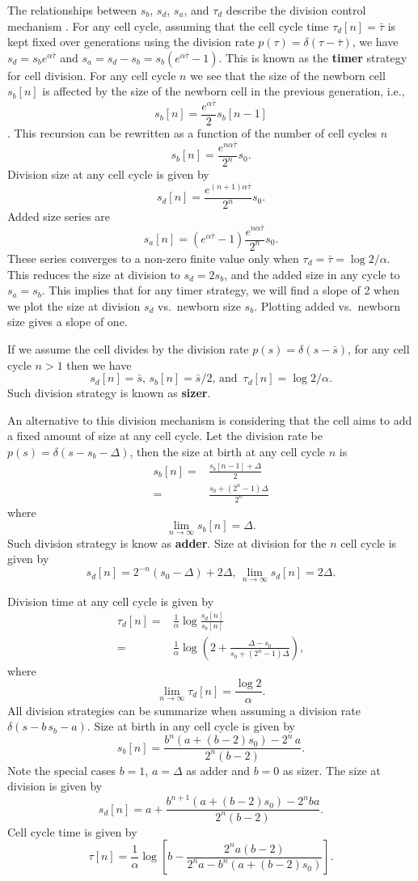 \documentclass[
  letterpaper,
  DIV=11,
  numbers=noendperiod]{scrreprt}
\begin{document}
The relationships between \(s_b\), \(s_d\), \(s_a\), and \(\tau_d\)
describe the division control mechanism \cite{}. For any cell cycle,
assuming that the cell cycle time \(\tau_d[n]=\bar{\tau}\) is kept fixed
over generations using the division rate
\(p(\tau)=\delta(\tau-\bar{\tau})\), we have
\(s_d=s_b e^{\alpha \bar{\tau}}\) and
\(s_a=s_d-s_b=s_b (e^{\alpha \bar{\tau}}-1)\). This is known as the
\textbf{timer} strategy for cell division. For any cell cycle \(n\) we
see that the size of the newborn cell \(s_b[n]\) is affected by the size
of the newborn cell in the previous generation, i.e.,
\[s_b[n]=\frac{e^{\alpha \bar{\tau}}}{2}s_b[n-1]\]. This recursion can
be rewritten as a function of the number of cell cycles \(n\)
\[s_b[n]= \frac{e^{n \alpha \bar{\tau}}}{2^{n}} s_0.\] Division size at
any cell cycle is given by
\[s_d[n]= \frac{e^{(n+1) \alpha \bar{\tau}}}{2^{n}} s_0.\] Added size
series are
\[s_a[n]= (e^{\alpha \bar{\tau}}-1)\frac{e^{n \alpha \bar{\tau}}}{2^{n}} s_0.\]
These series converges to a non-zero finite value only when
\(\tau_d=\bar{\tau}=\log{2}/\alpha.\) This reduces the size at division
to \(s_d=2 s_b\), and the added size in any cycle to \(s_a=s_b\). This
implies that for any timer strategy, we will find a slope of 2 when we
plot the size at division \(s_d\) vs.~newborn size \(s_b\). Plotting
added vs.~newborn size gives a slope of one.

If we assume the cell divides by the division rate
\(p(s)=\delta(s-\bar{s})\), for any cell cycle \(n>1\) then we have
\[s_d[n]=\bar{s},\, s_b[n]=\bar{s}/2,\, \text{and } \, \tau_d[n]=\log{2}/\alpha.\]
Such division strategy is known as \textbf{sizer}.

An alternative to this division mechanism is considering that the cell
aims to add a fixed amount of size at any cell cycle. Let the division
rate be \(p(s)=\delta(s-s_b-\Delta)\), then the size at birth at any
cell cycle \(n\) is \[\begin{aligned}
    s_b[n]=&\frac{s_b[n-1]+\Delta}{2}\\
    =&\frac{s_0+(2^n-1)\Delta}{2^n}
\end{aligned}\] where \[\lim_{n\to \infty}s_b[n]=\Delta.\] Such division
strategy is know as \textbf{adder}. Size at division for the \(n\) cell
cycle is given by \[
s_d[n]=2^{-n}(s_0 -\Delta)+2 \Delta, \, \lim_{n\to \infty}s_d[n]=2 \Delta.
\]

Division time at any cell cycle is given by \[\begin{aligned}
    \tau_d[n]=&\frac{1}{\alpha}\log \frac{s_d[n]}{s_b[n]}\\
    =&\frac{1}{\alpha}\log\left({2+\frac{\Delta-s_0}{s_0+(2^n-1)\Delta}}\right), 
\end{aligned}\] where
\[\lim_{n\to \infty}\tau_d[n]=\frac{\log 2}{\alpha}.\] All division
strategies can be summarize when assuming a division rate
\(\delta(s-b\,s_b-a)\). Size at birth in any cell cycle is given by \[
s_b[n]=\frac{b^n(a+(b-2)s_0)-2^n\,a}{2^n(b-2)}.
\] Note the special cases \(b=1\), \(a=\Delta\) as adder and \(b=0\) as
sizer. The size at division is given by \[
s_d[n]=a+\frac{b^{n+1}(a+(b-2)s_0)-2^nba}{2^n(b-2)}.
\] Cell cycle time is given by \[
\tau[n]=\frac{1}{\alpha}\log \left[b-\frac{2^n a(b-2)}{2^n a-b^n(a+(b-2) s_0)}\right].
\]
\end{document}
